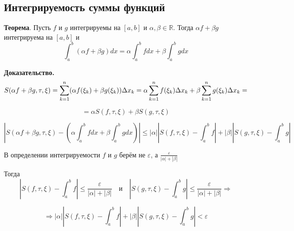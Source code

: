 \documentclass[a4paper]{article}
\begin{document}
\begin{definit}
\hypertarget{p2}{}
\subsection*{Интегрируемость суммы функций}
\begin{htheorem}\textbf{Теорема}.
Пусть $f$ и $g$ интегрируемы на $[a,b]$ и $\alpha, \beta \in \mathbb{R}$. Тогда $\alpha f + \beta g$ интегрируема на $[a,b]$ и $$\int_a^b(\alpha f + \beta g)dx = \alpha \int_a^b fdx + \beta \int_a^b gdx$$
\end{htheorem}

\begin{hproof}\textbf{Доказательство.}
$$S(\alpha f + \beta g, \tau, \xi) = \sum_{k=1}^n (\alpha f(\xi_k) + \beta g(\xi_k)) \Delta x_k = \newline \alpha \sum_{k=1}^n f(\xi_k) \Delta x_k + \beta \sum_{k=1}^n g(\xi_k) \Delta x_k = $$ 

$$= \alpha S(f, \tau, \xi) + \beta S(g, \tau, \xi)$$


$$ \left| S(\alpha f + \beta g, \tau, \xi) - \left( \alpha \int_a^b fdx + \beta \int_a^b gdx \right) \right| \leq |\alpha| \left| S(f, \tau, \xi) - \int_a^b f \right| + |\beta| \left| S(g, \tau, \xi) - \int_a^b g  \right|$$

В определении интегрируемости $f$ и $g$ берём не $\varepsilon$, а $\frac{\varepsilon}{|\alpha|+|\beta|}$

Тогда $$ \left| S(f, \tau, \xi) - \int_a^b f \right| \leq \frac{\varepsilon}{|\alpha|+|\beta|}\quad \text{и} \quad \left| S(g, \tau, \xi) - \int_a^b g  \right| \leq \frac{\varepsilon}{|\alpha|+|\beta|} \Rightarrow$$

$$
\Rightarrow |\alpha| \left| S(f, \tau, \xi) - \int_a^b f \right| + |\beta| \left| S(g, \tau, \xi) - \int_a^b g  \right| < \varepsilon$$

\end{hproof}
\end{definit}
\end{document}
